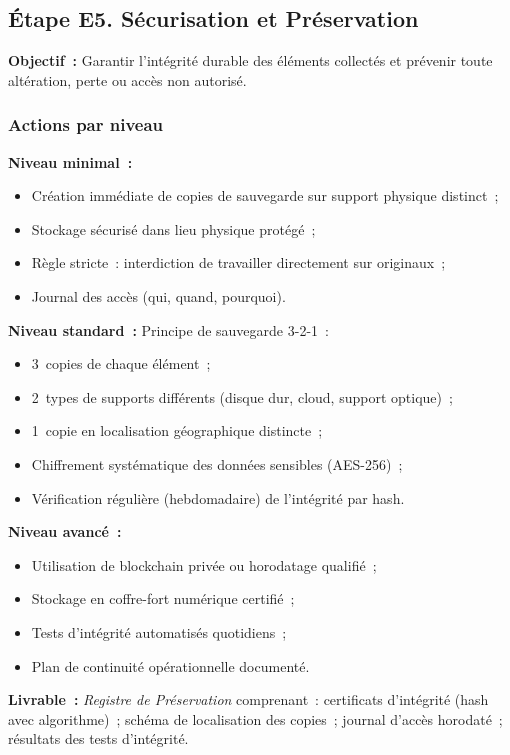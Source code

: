 \subsection{Étape E5. Sécurisation et Préservation}

\textbf{Objectif~:} Garantir l'intégrité durable des éléments collectés et
prévenir toute altération, perte ou accès non autorisé.

\subsubsection*{Actions par niveau}

\textbf{Niveau minimal~:}
\begin{itemize}
    \item Création immédiate de copies de sauvegarde sur support physique distinct~;
    \item Stockage sécurisé dans lieu physique protégé~;
    \item Règle stricte~: interdiction de travailler directement sur originaux~;
    \item Journal des accès (qui, quand, pourquoi).
\end{itemize}

\textbf{Niveau standard~:} Principe de sauvegarde 3-2-1~:
\begin{itemize}
    \item 3~copies de chaque élément~;
    \item 2~types de supports différents (disque dur, cloud, support optique)~;
    \item 1~copie en localisation géographique distincte~;
    \item Chiffrement systématique des données sensibles (AES-256)~;
    \item Vérification régulière (hebdomadaire) de l'intégrité par hash.
\end{itemize}

\textbf{Niveau avancé~:}
\begin{itemize}
    \item Utilisation de blockchain privée ou horodatage qualifié~;
    \item Stockage en coffre-fort numérique certifié~;
    \item Tests d'intégrité automatisés quotidiens~;
    \item Plan de continuité opérationnelle documenté.
\end{itemize}

\textbf{Livrable~:} \textit{Registre de Préservation} comprenant~:
certificats d'intégrité (hash avec algorithme)~; schéma de localisation des
copies~; journal d'accès horodaté~; résultats des tests d'intégrité.

